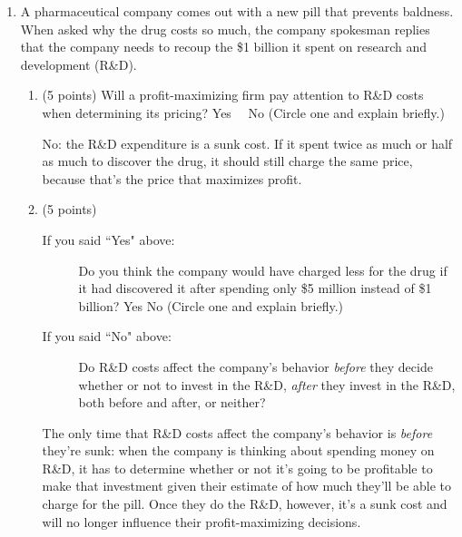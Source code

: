 \documentclass[twoside]{article}
\newcommand{\mybigskip}{\vspace{1in}}
\begin{document}
\begin{enumerate}


\item \begin{EXAM} A pharmaceutical company comes out with a new pill that prevents baldness. When asked why the drug costs so much, the company spokesman replies that the company needs to recoup the \$1 billion it spent on research and development (R\&D). \end{EXAM}

    \begin{enumerate}

    \item \begin{EXAM} (5 points) Will a profit-maximizing firm pay attention to R\&D costs when determining its pricing? Yes \ \   No  (Circle one and explain briefly.)     \mybigskip \end{EXAM}

\begin{KEY}
No: the R\&D expenditure is a sunk cost. If it spent twice as much or half as much to discover the drug, it should still charge the same price, because that's the price that maximizes profit.
\end{KEY}

    \item \begin{EXAM} (5 points)
        \begin{description}
        \item [If you said ``Yes" above:] Do you think the company would have charged less for the drug if it had discovered it after spending only \$5 million instead of \$1 billion? Yes  No  (Circle one and explain briefly.)
        \item [If you said ``No" above:] Do R\&D costs affect the company's behavior \emph{before} they decide whether or not to invest in the R\&D, \emph{after} they invest in the R\&D, both before and after, or neither?
         \end{description}
    \vspace{1in} \end{EXAM}

\begin{KEY}
The only time that R\&D costs affect the company's behavior is \emph{before} they're sunk: when the company is thinking about spending money on R\&D, it has to determine whether or not it's going to be profitable to make that investment given their estimate of how much they'll be able to charge for the pill. Once they do the R\&D, however, it's a sunk cost and will no longer influence their profit-maximizing decisions.
\end{KEY}


\end{enumerate}
\end{enumerate}
\end{document}
